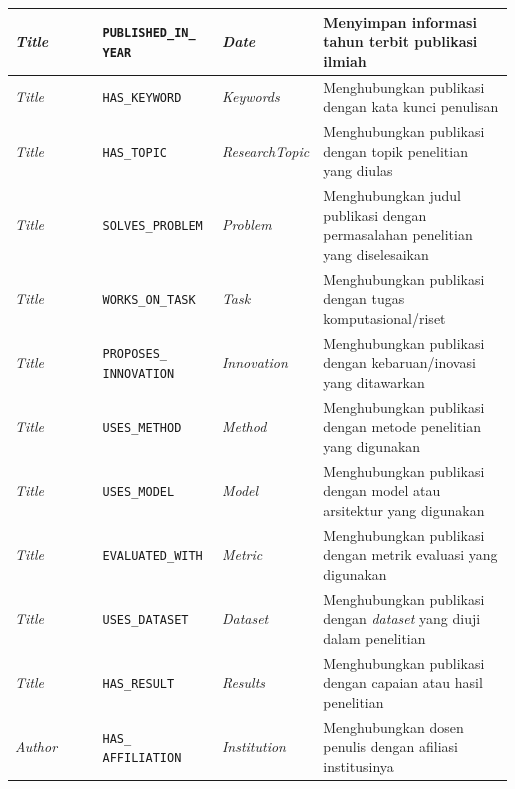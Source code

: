 \begin{enumerate}[label=\textbf{\arabic*.}, leftmargin=*, itemsep=10pt, listparindent=0.75cm]
\begin{enumerate}[label=\textbf{\arabic*.}, leftmargin=0.75cm, itemsep=5pt, listparindent=0.75cm]
\begin{longtable}{>{\raggedright\arraybackslash}p{0.18\linewidth} >{\raggedright\arraybackslash}p{0.24\linewidth} >{\raggedright\arraybackslash}p{0.18\linewidth} >{\raggedright\arraybackslash}p{0.39\linewidth}}
                        \textit{Title}      & \texttt{PUBLISHED\_IN\_ YEAR}  & \textit{Date}          & Menyimpan informasi tahun terbit publikasi ilmiah                              \\ \hline
                        \textit{Title}      & \texttt{HAS\_KEYWORD}          & \textit{Keywords}      & Menghubungkan publikasi dengan kata kunci penulisan                            \\ \hline
                        \textit{Title}      & \texttt{HAS\_TOPIC}            & \textit{ResearchTopic} & Menghubungkan publikasi dengan topik penelitian yang diulas                    \\ \hline
                        \textit{Title}      & \texttt{SOLVES\_PROBLEM}       & \textit{Problem}       & Menghubungkan judul publikasi dengan permasalahan penelitian yang diselesaikan \\ \hline
                        \textit{Title}      & \texttt{WORKS\_ON\_TASK}       & \textit{Task}          & Menghubungkan publikasi dengan tugas komputasional/riset                       \\ \hline
                        \textit{Title}      & \texttt{PROPOSES\_ INNOVATION} & \textit{Innovation}    & Menghubungkan publikasi dengan kebaruan/inovasi yang ditawarkan                \\ \hline
                        \textit{Title}      & \texttt{USES\_METHOD}          & \textit{Method}        & Menghubungkan publikasi dengan metode penelitian yang digunakan                \\ \hline
                        \textit{Title}      & \texttt{USES\_MODEL}           & \textit{Model}         & Menghubungkan publikasi dengan model atau arsitektur yang digunakan            \\ \hline
                        \textit{Title}      & \texttt{EVALUATED\_WITH}       & \textit{Metric}        & Menghubungkan publikasi dengan metrik evaluasi yang digunakan                  \\ \hline
                        \textit{Title}      & \texttt{USES\_DATASET}         & \textit{Dataset}       & Menghubungkan publikasi dengan \textit{dataset} yang diuji dalam penelitian    \\ \hline
                        \textit{Title}      & \texttt{HAS\_RESULT}           & \textit{Results}       & Menghubungkan publikasi dengan capaian atau hasil penelitian                   \\ \hline
                        \textit{Author}     & \texttt{HAS\_ AFFILIATION}     & \textit{Institution}   & Menghubungkan dosen penulis dengan afiliasi institusinya                       \\

\end{longtable}
\end{enumerate}
\end{enumerate}

